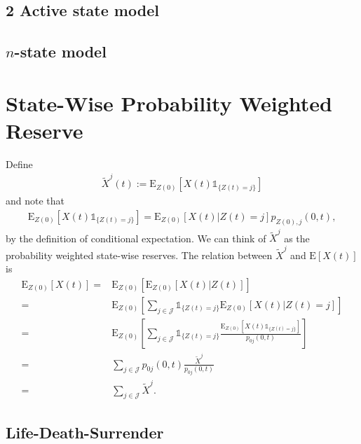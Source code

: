 \documentclass[12pt]{article}
\newcommand{\E}{\text{E}}
\newcommand{\indic}[1]{\mathds{1}_{ \{ #1 \} }}
\begin{document}
\subsection*{2 Active state model}

\subsection*{$n$-state model}


\section*{State-Wise Probability Weighted Reserve}
Define
\begin{align*}
\tilde{X}^j(t):=\E_{Z(0)}[X(t)\indic{Z(t)=j}]
\end{align*}
and note that
\begin{align}
\E_{Z(0)}[X(t)\indic{Z(t)=j}]= \E_{Z(0)}[X(t)|Z(t)=j]p_{Z(0),j}(0,t), \label{eq:1}
\end{align}
by the definition of conditional expectation. We can think of $\tilde{X}^j$ as the probability weighted state-wise reserves. The relation between $\tilde{X}^j$ and $\E[X(t)]$ is
\begin{align*}
\E_{Z(0)}[X(t)] =& \E_{Z(0)}[\E_{Z(0)} [ X(t)|Z(t)]] 
\\
=&
\E_{Z(0)} \left[ \sum_{j\in \mathcal{J}} \indic{Z(t)=j} \E_{Z(0)} [ X(t)|Z(t)=j] \right]
\\
=&
\E_{Z(0)} \left[ \sum_{j\in \mathcal{J}} \indic{Z(t)=j} \frac{\E_{Z(0)}[X(t)\indic{Z(t)=j}]}{p_{0j}(0,t)} \right]
\\
=&
\sum_{j\in \mathcal{J}} p_{0j}(0,t) \frac{ \tilde{X}^j}{p_{0j}(0,t)}
\\
=&
\sum_{j\in \mathcal{J}} \tilde{X}^j.
\end{align*}




\subsection*{Life-Death-Surrender}
\def\PlA{(0,0)}
\begin{center}
\end{center}
\end{document}
